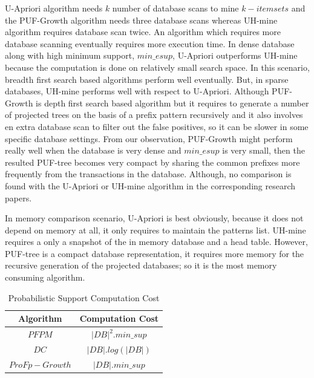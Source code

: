 U-Apriori algorithm needs $k$ number of database scans to mine $k-itemsets$ and the PUF-Growth algorithm needs three database scans whereas UH-mine algorithm requires database scan twice. An algorithm which requires more database scanning eventually requires more execution time. In dense database along with high minimum support, $min\_esup$, U-Apriori outperforms UH-mine because the computation is done on relatively small search space. In this scenario, breadth first search based algorithms perform well eventually. But, in sparse databases, UH-mine performs well with respect to U-Apriori. Although PUF-Growth is depth first search based algorithm but it requires to generate a number of projected trees on the basis of a prefix pattern recursively and it also involves en extra  database scan to filter out the false positives, so it can be slower in some specific database settings. From our observation, PUF-Growth might perform really well when the database is very dense and $min\_esup$ is very small,  then the resulted PUF-tree becomes very compact by sharing the common prefixes more frequently from the transactions in the database. Although, no comparison is found with the U-Apriori or UH-mine algorithm in the corresponding research papers.

In memory comparison scenario, U-Apriori is best obviously, because it does not depend on memory at all, it only requires to maintain the patterns list. UH-mine requires a only a snapshot of the in memory database and a head table. However,  PUF-tree is a compact database representation, it requires more memory for the recursive generation of the projected databases; so it is the most memory consuming algorithm. 

\begin{table}
\parbox{.90\linewidth}{
\centering
\begin{tabular}{| c | c |}\hline
Algorithm & Computation Cost\\ \hline  \hline
$PFPM$ & $|DB|^2.min\_sup$ \\ \hline
$DC$ & $|DB|.log(|DB|)$ \\ \hline
$ProFp-Growth$ & $|DB|.min\_sup$ \\ \hline
\end{tabular}
\caption{Probabilistic Support Computation Cost}
\label{comp}
}
\end{table}


